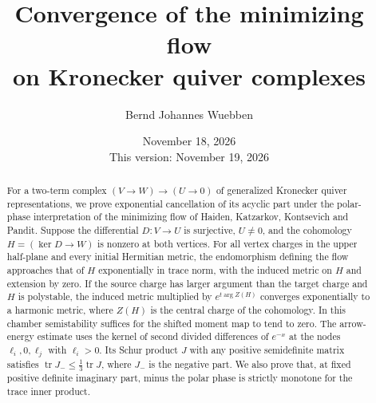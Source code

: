 \documentclass[11pt]{amsart}
\title[The minimizing flow on Kronecker quiver complexes]{Convergence of the
minimizing flow\\ on Kronecker quiver complexes}
\author{Bernd Johannes Wuebben}
\date{November 18, 2026\\This version: November 19, 2026}
\theoremstyle{definition}
\theoremstyle{remark}
\begin{document}
\begin{abstract}
For a two-term complex $(V\to W)\to(U\to0)$ of generalized Kronecker
quiver representations, we prove exponential cancellation of its acyclic
part under the polar-phase interpretation of the minimizing flow of
Haiden, Katzarkov, Kontsevich and Pandit. Suppose the differential
$D\colon V\to U$ is surjective, $U\ne0$, and the cohomology
$H=(\ker D\to W)$ is nonzero at both vertices. For all vertex charges in
the upper half-plane and every initial Hermitian metric, the endomorphism
defining the flow approaches that of $H$ exponentially in trace norm,
with the induced metric on $H$ and extension by zero. If the source
charge has larger argument than the target charge and $H$ is polystable, the induced metric
multiplied by $e^{t\arg Z(H)}$ converges exponentially to a harmonic
metric, where $Z(H)$ is the central charge of the cohomology. In this chamber semistability suffices for the shifted moment
map to tend to zero. The arrow-energy estimate uses the kernel of second divided differences
of $e^{-x}$ at the nodes $\ell_i,0,\ell_j$ with $\ell_i>0$. Its Schur
product $J$ with any positive semidefinite matrix satisfies
$\operatorname{tr}J_-\leq\frac13\operatorname{tr}J$, where $J_-$ is
the negative part. We also prove that, at fixed positive definite
imaginary part, minus the polar phase is strictly monotone for the trace
inner product.
\end{abstract}
\maketitle












\end{document}
